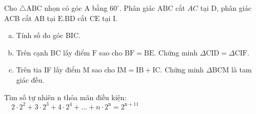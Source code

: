 \begin{bt}
	Cho $\triangle \mathrm{ABC}$ nhọn có góc $\mathrm{A}$ bằng $60^{\circ}$. Phân giác $\mathrm{ABC}$ cắt $A C$ tại $\mathrm{D}$, phân giác $\mathrm{ACB}$ cắt $\mathrm{AB}$ tại $\mathrm{E} . \mathrm{BD}$ cắt $\mathrm{CE}$ tại $\mathrm{I}$.
	\begin{enumerate}[a.]
		\item Tính số đo góc BIC.
		\item Trên cạnh BC lấy điểm $\mathrm{F}$ sao cho $\mathrm{BF}=\mathrm{BE}$. Chứng minh $\Delta \mathrm{CID}=\Delta \mathrm{CIF}$.
		\item Trên tia IF lấy điểm $\mathrm{M}$ sao cho $\mathrm{IM}=\mathrm{IB}+\mathrm{IC}$. Chứng minh $\Delta \mathrm{BCM}$ là tam giác đều.
	\end{enumerate}
	\loigiai{}
\end{bt}

\begin{bt}
	Tìm số tự nhiên $\mathrm{n}$ thỏa mãn điều kiện: $\quad 2 \cdot 2^2+3 \cdot 2^3+4 \cdot 2^4+\ldots+n \cdot 2^{\mathrm{n}}=2^{\mathrm{n}+11}$
	\loigiai{}
\end{bt}
